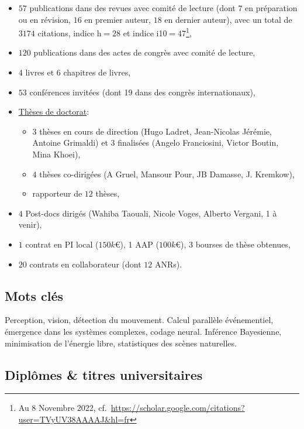 \documentclass[10pt,french,a4paper,oneside]{article}%
\begin{document}
\begin{itemize}

\item  	$57$ publications dans des revues avec comité de lecture (dont $7$ en préparation ou en révision, $16$ en premier auteur, $18$ en dernier auteur), avec un total de $3174$ citations, indice h$=28$ et  indice i10$=47$\footnote{Au 8 Novembre 2022, cf.~\url{https://scholar.google.com/citations?user=TVyUV38AAAAJ&hl=fr}},
\item	$120$ publications dans des actes de congrès avec comité de lecture,
\item	$4$ livres et $6$ chapitres de livres,
\item	$53$ conférences invitées (dont 19 dans des congrès internationaux),
\item \href{https://www.theses.fr/074493701}{Thèses de doctorat}:
\begin{itemize}
\item $3$ thèses en cours de direction (Hugo Ladret, Jean-Nicolas Jérémie, Antoine Grimaldi) et $3$ finalisées (Angelo Franciosini, Victor Boutin, Mina Khoei),
\item $4$ thèses co-dirigées (A Gruel, Mansour Pour, JB Damasse, J. Kremkow),
\item rapporteur de $12$ thèses,
\end{itemize} %
\item $4$ Post-docs dirigés (Wahiba Taouali, Nicole Voges, Alberto Vergani, 1 à venir),
\item $1$ contrat en PI local ($150 k$\euro{}), 1 AAP ($100 k$\euro{}), $3$ bourses de thèse obtenues,
\item $20$ contrats en collaborateur (dont $12$ ANRs).

\end{itemize} %

\subsection*{Mots clés}
Perception, vision, détection du mouvement. Calcul parallèle événementiel, émergence dans les systèmes complexes, codage neural. Inférence Bayesienne, minimisation de l'énergie libre, statistiques des scènes naturelles.

\subsection{Diplômes \& titres universitaires}
\end{document}
